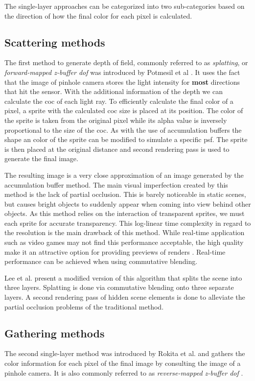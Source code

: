 The single-layer approaches can be categorized into two sub-categories based on the direction of how the final color for each pixel is calculated.

\subsection{Scattering methods}
The first method to generate depth of field, commonly referred to as \textit{splatting}, or \textit{forward-mapped z-buffer \gls{dof}} was introduced by Potmesil et al \cite{Potmesil.1981}.
It uses the fact that the image of pinhole camera stores the light intensity for \textbf{most} directions that hit the sensor.
With the additional information of the depth we can calculate the \gls{coc} of each light ray.
To efficiently calculate the final color of a pixel, a sprite with the calculated \gls{coc} size is placed at its position.
The color of the sprite is taken from the original pixel while its alpha value is inversely proportional to the size of the \gls{coc}.
As with the use of accumulation buffers the shape an color of the sprite can be modified to simulate a specific \gls{psf}.
The sprite is then placed at the original distance and second rendering pass is used to generate the final image.

The resulting image is a very close approximation of an image generated by the accumulation buffer method.
The main visual imperfection created by this method is the lack of partial occlusion.
This is barely noticeable in static scenes, but causes bright objects to suddenly appear when coming into view behind other objects.
As this method relies on the interaction of transparent sprites, we must each sprite for accurate transparency.
This log-linear time complexity in regard to the resolution is the main drawback of this method.
While real-time application such as video games may not find this performance acceptable, the high quality make it an attractive option for providing previews of renders \cite{Demers.2005}.
Real-time performance can be achieved when using commutative blending.

Lee et al. \cite{Lee.2008} present a modified version of this algorithm that splits the scene into three layers.
Splatting is done via commutative blending onto three separate layers.
A second rendering pass of hidden scene elements is done to alleviate the partial occlusion problems of the traditional method.

\subsection{Gathering methods}
The second single-layer method was introduced by Rokita et al. \cite{Rokita.1993} and gathers the color information for each pixel of the final image by consulting the image of a pinhole camera.
It is also commonly referred to as \textit{reverse-mapped z-buffer \gls{dof}} \cite{Gilham.2007}.

